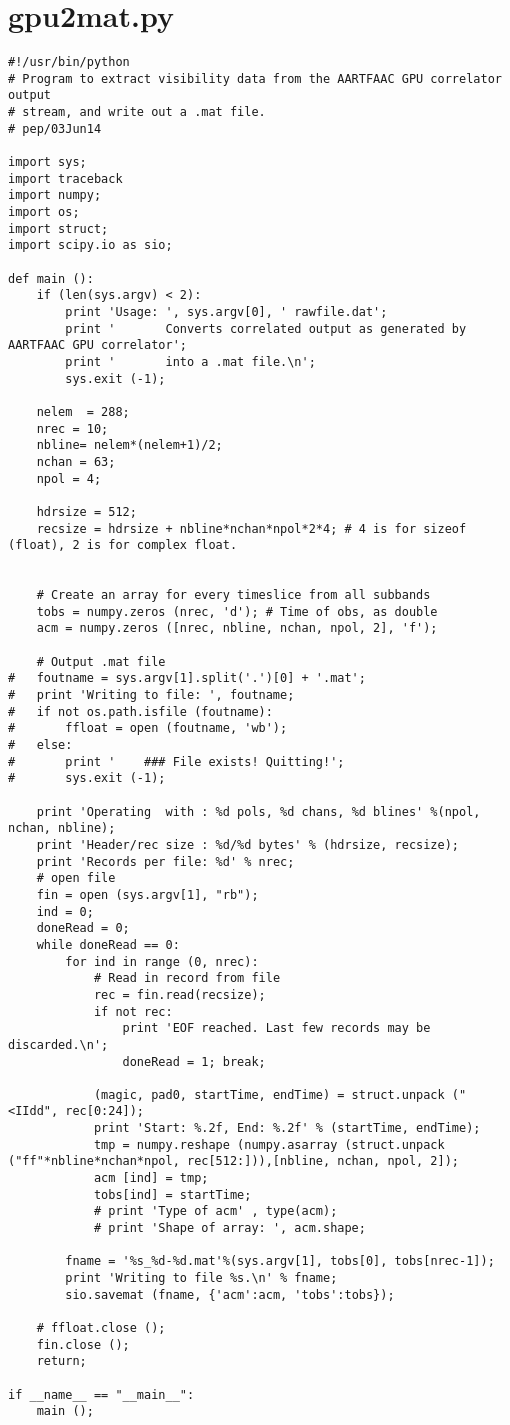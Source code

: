 \documentclass {article}
\begin{document}
\section {gpu2mat.py}
\begin{verbatim}
#!/usr/bin/python
# Program to extract visibility data from the AARTFAAC GPU correlator output
# stream, and write out a .mat file.
# pep/03Jun14

import sys;
import traceback
import numpy;
import os;
import struct;
import scipy.io as sio;

def main ():
	if (len(sys.argv) < 2):
		print 'Usage: ', sys.argv[0], ' rawfile.dat';
		print '       Converts correlated output as generated by AARTFAAC GPU correlator';
		print '       into a .mat file.\n';
		sys.exit (-1);

	nelem  = 288;       
	nrec = 10;
	nbline= nelem*(nelem+1)/2; 
	nchan = 63;
	npol = 4;

	hdrsize = 512;
	recsize = hdrsize + nbline*nchan*npol*2*4; # 4 is for sizeof (float), 2 is for complex float.

	
	# Create an array for every timeslice from all subbands
	tobs = numpy.zeros (nrec, 'd'); # Time of obs, as double
	acm = numpy.zeros ([nrec, nbline, nchan, npol, 2], 'f');
	
	# Output .mat file
#	foutname = sys.argv[1].split('.')[0] + '.mat';
#	print 'Writing to file: ', foutname;
#	if not os.path.isfile (foutname):
#		ffloat = open (foutname, 'wb');
#	else:
#		print '	   ### File exists! Quitting!';
#		sys.exit (-1);
	
	print 'Operating  with : %d pols, %d chans, %d blines' %(npol, nchan, nbline);
	print 'Header/rec size : %d/%d bytes' % (hdrsize, recsize);
	print 'Records per file: %d' % nrec;
	# open file
	fin = open (sys.argv[1], "rb");
	ind = 0;
	doneRead = 0;
	while doneRead == 0:
		for ind in range (0, nrec):
			# Read in record from file
			rec = fin.read(recsize);
			if not rec: 
				print 'EOF reached. Last few records may be discarded.\n';
		 		doneRead = 1; break;
	
			(magic, pad0, startTime, endTime) = struct.unpack ("<IIdd", rec[0:24]);
			print 'Start: %.2f, End: %.2f' % (startTime, endTime);
			tmp = numpy.reshape (numpy.asarray (struct.unpack ("ff"*nbline*nchan*npol, rec[512:])),[nbline, nchan, npol, 2]);
			acm [ind] = tmp;
			tobs[ind] = startTime;
			# print 'Type of acm' , type(acm);
			# print 'Shape of array: ', acm.shape;
	
		fname = '%s_%d-%d.mat'%(sys.argv[1], tobs[0], tobs[nrec-1]);
		print 'Writing to file %s.\n' % fname;
		sio.savemat (fname, {'acm':acm, 'tobs':tobs});

	# ffloat.close ();
	fin.close ();
	return;

if __name__ == "__main__":
	main ();
\end{verbatim}
\end{document}
